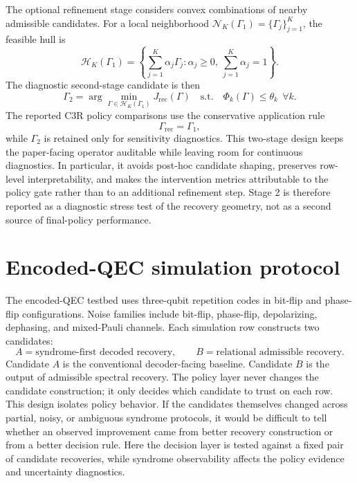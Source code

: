 \documentclass[11pt]{article}
\numberwithin{equation}{section}
\begin{document}
The optional refinement stage considers convex combinations of nearby admissible
candidates. For a local neighborhood
$\mathcal N_K(\Gamma_1)=\{\Gamma_j\}_{j=1}^{K}$, the feasible hull is
\begin{equation}
\mathcal H_K(\Gamma_1)
=
\left\{
\sum_{j=1}^{K}\alpha_j\Gamma_j:
\alpha_j\ge 0,\ 
\sum_{j=1}^{K}\alpha_j=1
\right\}.
\end{equation}
The diagnostic second-stage candidate is then
\begin{equation}
\Gamma_2
=
\arg\min_{\Gamma\in\mathcal H_K(\Gamma_1)}
J_{\mathrm{rec}}(\Gamma)
\quad
\mathrm{s.t.}\quad
\Phi_k(\Gamma)\le \theta_k\ \ \forall k .
\end{equation}
The reported C3R policy comparisons use the conservative application rule
\begin{equation}
\Gamma_{\mathrm{rec}}=\Gamma_1,
\end{equation}
while $\Gamma_2$ is retained only for sensitivity diagnostics. This two-stage
design keeps the paper-facing operator auditable while leaving room for continuous
diagnostics. In particular, it avoids post-hoc candidate shaping, preserves
row-level interpretability, and makes the intervention metrics attributable to
the policy gate rather than to an additional refinement step. Stage 2 is therefore
reported as a diagnostic stress test of the recovery geometry, not as a second
source of final-policy performance.

\section{Encoded-QEC simulation protocol}

The encoded-QEC testbed uses three-qubit repetition codes in bit-flip and
phase-flip configurations. Noise families include bit-flip, phase-flip,
depolarizing, dephasing, and mixed-Pauli channels. Each simulation row constructs
two candidates:
\begin{equation}
A=\text{syndrome-first decoded recovery},
\qquad
B=\text{relational admissible recovery}.
\end{equation}
Candidate $A$ is the conventional decoder-facing baseline. Candidate $B$ is the
output of admissible spectral recovery. The policy layer never changes the
candidate construction; it only decides which candidate to trust on each row.
This design isolates policy behavior. If the candidates themselves changed across
partial, noisy, or ambiguous syndrome protocols, it would be difficult to tell
whether an observed improvement came from better recovery construction or from a
better decision rule. Here the decision layer is tested against a fixed pair of
candidate recoveries, while syndrome observability affects the policy evidence and
uncertainty diagnostics.
\end{document}
